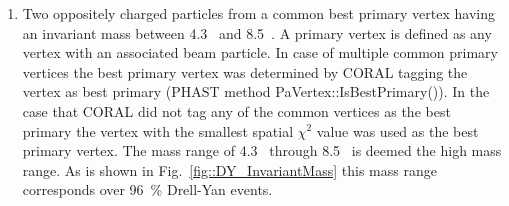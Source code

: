 \begin{enumerate}
  \label{tab::cutdescrip}
\item Two oppositely charged particles from a common best primary vertex having
  an invariant mass between 4.3~{\gvcw} and 8.5~{\gvcw}.  A primary vertex is
  defined as any vertex with an associated beam particle.  In case of multiple
  common primary vertices the best primary vertex was determined by CORAL
  tagging the vertex as best primary (PHAST method PaVertex::IsBestPrimary()).
  In the case that CORAL did not tag any of the common vertices as the best
  primary the vertex with the smallest spatial $\chi^2$ value was used as the
  best primary vertex.  The mass range of 4.3~{\gvcw} through 8.5~{\gvcw} is
  deemed the high mass range.  As is shown in Fig.~\ref{fig::DY_InvariantMass}
  this mass range corresponds over 96~\% Drell-Yan events.


\end{enumerate}
